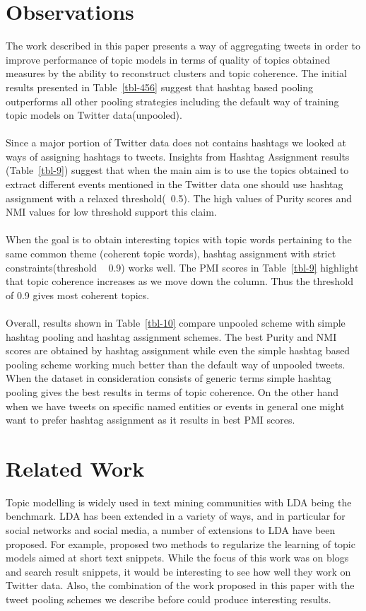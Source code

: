 \documentclass[10pt,a5paper,twoside]{article}
\begin{document}
\section{Observations}
The work described in this paper presents a way of aggregating tweets in order to improve performance of topic models in terms of quality of topics obtained  measures by the ability to reconstruct clusters and topic coherence. The initial results presented in Table~\ref{tbl-456} suggest that hashtag based pooling outperforms all other pooling strategies including the default way of training topic models on Twitter data(unpooled).
\\\\
Since a major portion of Twitter data does not contains hashtags we looked at ways of assigning hashtags to tweets. Insights from Hashtag Assignment results (Table~\ref{tbl-9}) suggest that when the main aim is to use the topics obtained to extract different events mentioned in the Twitter data one should use hashtag assignment with a relaxed threshold(~0.5). The high values of Purity scores and NMI values for low threshold support this claim.
\\\\
When the goal is to obtain interesting topics with topic words pertaining to the same common theme (coherent topic words), hashtag assignment with strict constraints(threshold ~ 0.9) works well. The PMI scores in Table~\ref{tbl-9} highlight that topic coherence increases as we move down the column. Thus the threshold of 0.9 gives most coherent topics.
\\\\
Overall, results shown in Table~\ref{tbl-10} compare unpooled scheme with simple hashtag pooling and hashtag assignment schemes. The best Purity and NMI scores are obtained by hashtag assignment while even the simple hashtag based pooling scheme working much better than the default way of unpooled tweets. When the dataset in consideration consists of generic terms simple hashtag pooling gives the best results in terms of topic coherence. On the other hand when we have tweets on specific named entities or events in general one might want to prefer hashtag assignment as it results in best PMI scores. 
\\


\section{Related Work}
Topic modelling is widely used in text mining communities with LDA
being the benchmark.  LDA has been extended in a variety of ways, and
in particular for social networks and social media, a number of
extensions to LDA have been proposed.  For example, \cite{newman11} proposed
two methods to regularize the learning of topic models aimed at short
text snippets. While the focus of this work was on blogs and search
result snippets, it would be interesting to see how well they work on
Twitter data. Also, the combination of the work proposed in this paper
with the tweet pooling schemes we describe before could produce
interesting results.
\end{document}
